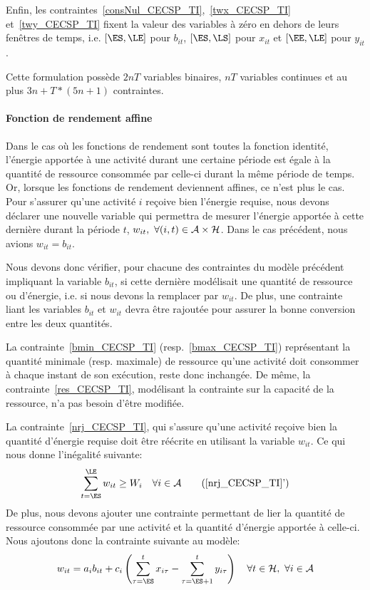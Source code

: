 Enfin, les contraintes~\eqref{consNul_CECSP_TI},~\eqref{twx_CECSP_TI}
et~\eqref{twy_CECSP_TI} fixent la valeur des variables à zéro en
dehors de leurs fenêtres de temps, i.e. $[\ES,\LE]$ pour $b_{it}$,
$[\ES,\LS]$ pour $x_{it}$ et $[\EE,\LE]$ pour $y_{it}$.

Cette formulation possède $2nT$ variables binaires, $nT$ variables
continues et au plus $3n+T*(5n+1)$ contraintes.

\paragraph{Fonction de rendement affine}

Dans le cas où les fonctions de rendement sont toutes la fonction
identité, l'énergie apportée à une activité durant une certaine
période est égale à la quantité de ressource consommée par celle-ci
durant la même période de temps. Or, lorsque les fonctions de
rendement deviennent affines, ce n'est plus le cas.  Pour s'assurer
qu'une activité $i$ reçoive bien l'énergie requise, nous devons
déclarer une nouvelle variable qui permettra de mesurer l'énergie
apportée à cette dernière durant la période $t$, $w_{it},\ \forall
(i,t) \in {\cal A} \times {\cal H}$. Dans le cas
précédent, nous avions $w_{it}=b_{it}$.

Nous devons donc vérifier, pour chacune des contraintes du modèle
précédent impliquant la variable $b_{it}$, si cette dernière
modélisait une quantité de ressource ou d'énergie, i.e. si nous devons
la remplacer par $w_{it}$. De plus, une contrainte liant les variables
$b_{it}$ et $w_{it}$ devra être rajoutée pour assurer la bonne
conversion entre les deux quantités.

La contrainte~\eqref{bmin_CECSP_TI} (resp.~\eqref{bmax_CECSP_TI})
représentant la quantité minimale (resp. maximale) de ressource qu'une
activité doit consommer à chaque instant de son exécution, reste donc
inchangée. De même, la contrainte~\eqref{res_CECSP_TI}, modélisant la
contrainte sur la capacité de la ressource, n'a pas besoin d’être
modifiée.

La contrainte~\eqref{nrj_CECSP_TI}, qui s'assure qu'une activité
reçoive bien la quantité d'énergie requise doit être réécrite en
utilisant la variable $w_{it}$. Ce qui nous donne l'inégalité
suivante:
\begin{equation} 
\sum_{t=\ES}^{\LE} w_{it} \ge W_i\quad \forall i \in \A \tag{\ref{nrj_CECSP_TI}'} \label{nrj2_CECSP_TI}
\end{equation} 
De plus, nous devons ajouter une contrainte permettant de lier la
quantité de ressource consommée par une activité et la quantité
d'énergie apportée à celle-ci. Nous ajoutons donc la contrainte
suivante au modèle:
\begin{equation}
w_{it}=a_ib_{it}+c_i\left(\sum_{\tau=\ES}^t
x_{i\tau}-\sum_{\tau=\ES+1}^t y_{i\tau}\right) \quad \forall t\in
\H,\ \forall i \in \A \label{conv_CECSP_TI}
\end{equation} 

